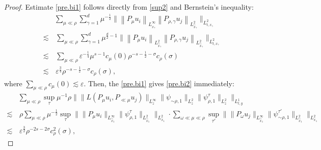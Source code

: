 \documentclass[11pt,letterpaper,reqno]{amsart}
\numberwithin{equation}{section}
\theoremstyle{definition}
\theoremstyle{remark}
\begin{document}
\begin{proof}
  Estimate \eqref{pre.bi1} follows directly from \eqref{sup2} and Bernstein's inequality:
\begin{align*}
 &  \sum_{\mu\ll \rho}  \sum_{\gamma=1}^d \mu^{-\frac 12} \big\| \left\|P_{\mu } u_i\right\|_{L^\infty_{\widehat{x}_\gamma}} \left\|P_{  \rho,\gamma}    u_j\right\|_{L^2_{\widehat{x}_\gamma}}\big\|_{L^2_{t,x_\gamma}}\\
	\lesssim &\, 	 \sum_{\mu\ll \rho}\sum_{\gamma=1}^d \mu^{\frac{d}{2}-1} \big\| \left\|P_{\mu} u_i\right\|_{L^2_{\widehat{x}_\gamma}} \left\|P_{ \rho,\gamma}    u_j\right\|_{L^2_{\widehat{x}_\gamma}}\big\|_{L^2_{t,x_\gamma}}\\
	\lesssim &\,  \sum_{\mu\ll \rho}  \varepsilon^{-\frac 14}\mu^{s-1} c_\mu(0) \rho^{-s-\frac12-\sigma} c_{\rho} (\sigma) \\
	\lesssim &\,\varepsilon^{\frac 34}   \rho^{-s-\frac12-\sigma} c_{\rho} (\sigma),
\end{align*}
where \(\sum_{\mu \ll \rho}   c_{\mu} (0) \lesssim \varepsilon\). Then, the \eqref{pre.bi1} gives   \eqref{pre.bi2} immediately:
\begin{align*}
&  \sum_{\mu \ll \rho} \sup_\tau \mu^{-1}\rho \Big\| \|    	L(P_{ \mu} u_i, P_{\ll \mu }u_j)  \|_{L^\infty_z} \|    \psi_{\sim \rho,1} \|_{L^2_z}   \|     \psi _{\rho,1}^\tau\|_{L^2_z}     \Big\|_{L^1_{t,y}}   \\
\lesssim&  \,\rho   \sum_{\mu \ll \rho}  \mu^{-\frac 12}	\sup_\tau  \Big\| \|    	P_{ \mu} u_i  \|_{L^\infty_{\widehat{x}_1}}        \|     \psi _{\rho,1}^\tau\|_{L^2_{\widehat{x}_1}}     \Big\|_{L^2_{x_1}}    \cdot  \sum_{\omega \ll \mu \ll \rho }	 	\sup_{\tau'}  \Big\| \|    	P_{ \omega} u_j  \|_{L^\infty_{\widehat{x}_1}}        \|     \psi _{\sim\rho,1}^{\tau'}\|_{L^2_{\widehat{x}_1}}     \Big\|_{L^2_{x_1}}\\
 	\lesssim &\, \varepsilon^{\frac32}   \rho^{-2s -2\sigma}c_{\rho }^2 (\sigma),  \nonumber
\end{align*}







\end{proof}
\end{document}
